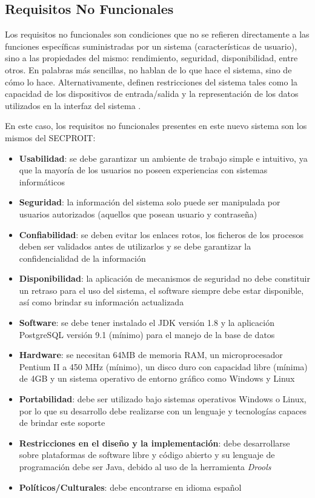 \subsection{Requisitos No Funcionales}
Los requisitos no funcionales son condiciones que no se refieren directamente a las funciones específicas suministradas por un sistema (características de usuario), sino a las propiedades del mismo: rendimiento, seguridad, disponibilidad, entre otros. En palabras más sencillas, no hablan de lo que hace el sistema, sino de cómo lo hace. Alternativamente, definen restricciones del sistema tales como la capacidad de los dispositivos de entrada/salida y la representación de los datos utilizados en la interfaz del sistema \cite{Dave2022}.

En este caso, los requisitos no funcionales presentes en este nuevo sistema son los mismos del SECPROIT:

\begin{itemize}
\item \textbf{Usabilidad}: se debe garantizar un ambiente de trabajo simple e intuitivo, ya que la mayoría de los usuarios no poseen experiencias con sistemas informáticos
\item \textbf{Seguridad}: la información del sistema solo puede ser manipulada por usuarios autorizados (aquellos que posean usuario y contraseña)
\item \textbf{Confiabilidad}: se deben evitar los enlaces rotos, los ficheros de los procesos deben ser validados antes de utilizarlos y se debe garantizar la confidencialidad de la información
\item \textbf{Disponibilidad}: la aplicación de mecanismos de seguridad no debe constituir un retraso para el uso del sistema, el software siempre debe estar disponible, así como brindar su información actualizada
\item \textbf{Software}: se debe tener instalado el JDK versión 1.8 y la aplicación PostgreSQL versión 9.1 (mínimo) para el manejo de la base de datos
\item \textbf{Hardware}: se necesitan 64MB de memoria RAM, un microprocesador Pentium II a 450 MHz (mínimo), un disco duro con capacidad libre (mínima) de 4GB y un sistema operativo de entorno gráfico como Windows y Linux
\item \textbf{Portabilidad}: debe ser utilizado bajo sistemas operativos Windows o Linux, por lo que su desarrollo debe realizarse con un lenguaje y tecnologías capaces de brindar este soporte
\item \textbf{Restricciones en el diseño y la implementación}: debe desarrollarse sobre plataformas de software libre y código abierto y su lenguaje de programación debe ser Java, debido al uso de la herramienta \textsl{Drools}
\item \textbf{Políticos/Culturales}: debe encontrarse en idioma español
\end{itemize}

